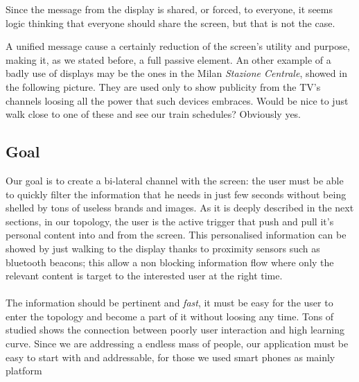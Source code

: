 \documentclass[]{usiinfbachelorproject}
\begin{document}
\begin{figure}[H]
  \centering
\end{figure} 
Since the message from the display is shared, or forced, to everyone, it seems logic thinking that everyone should share the screen, but that is not the case.

A unified message cause a certainly reduction of the screen's utility and purpose, making it, as we stated before, a full passive element. An other example of a badly use of displays may be the ones in the Milan \emph{Stazione Centrale}, showed in the following picture.
They are used only to show publicity from the TV's channels loosing all the power that such devices embraces. Would be nice to just walk close to one of these and see our train schedules? Obviously yes. 


\subsection{Goal}

Our goal is to create a bi-lateral channel with the screen: the user must be able to quickly filter the information that he needs in just few seconds without being shelled by tons of useless brands and images. As it is deeply described in the next sections, in our topology, the user is the active trigger that push and pull it's personal content into and from the screen. This personalised information can be showed by just walking to the display thanks to proximity sensors such as bluetooth beacons; this allow a non blocking information flow where only the relevant content is target to the interested user at the right time.
\\
\\
The information should be pertinent and \emph{fast}, it must be easy for the user to enter the topology and become a part of it without loosing any time. Tons of studied shows the connection between poorly user interaction and high learning curve. Since we are addressing a endless mass of people, our application must be easy to start with and addressable, for those we used smart phones as mainly platform
\end{document}
